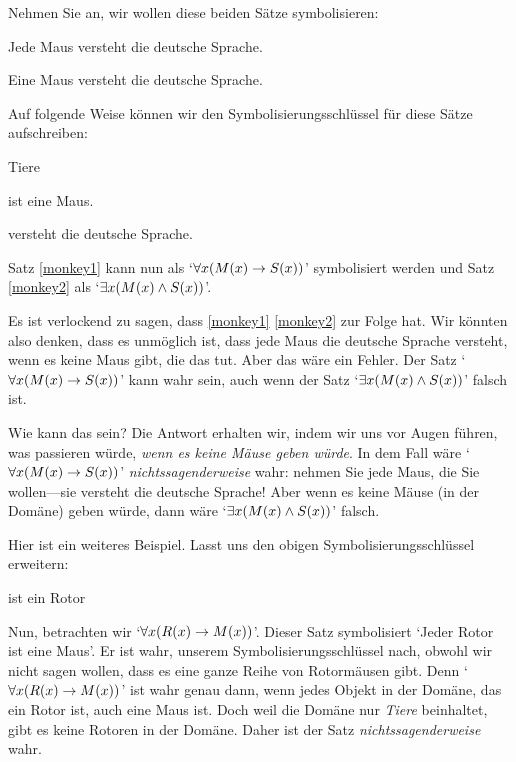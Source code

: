Nehmen Sie an, wir wollen diese beiden Sätze symbolisieren:
	\begin{earg}
		\item[\ex{monkey1}] Jede Maus versteht die deutsche Sprache.
		\item[\ex{monkey2}] Eine Maus versteht die deutsche Sprache.
	\end{earg}
Auf folgende Weise können wir den Symbolisierungsschlüssel für diese Sätze aufschreiben:
	\begin{ekey}
		\item[\text{Domäne}] Tiere
		\item[\atom{M}{x}]  ist eine Maus.
		\item[\atom{S}{x}]  versteht die deutsche Sprache.
	\end{ekey}
Satz \ref{monkey1} kann nun als `$\forall x(\mathord{M}(x) \rightarrow \mathord{S}(x))$' symbolisiert werden und Satz \ref{monkey2} als `$\exists x(\mathord{M}(x) \wedge \mathord{S}(x))$'.

Es ist verlockend zu sagen, dass \ref{monkey1} \ref{monkey2} zur Folge hat. Wir könnten also denken, dass es unmöglich ist, dass jede Maus die deutsche Sprache versteht, wenn es keine Maus gibt, die das tut. Aber das wäre ein Fehler. Der Satz `$\forall x(\mathord{M}(x) \rightarrow \mathord{S}(x))$'  kann wahr sein, auch wenn der Satz `$\exists x(\mathord{M}(x) \wedge \mathord{S}(x))$' falsch ist.

Wie kann das sein? Die Antwort erhalten wir, indem wir uns vor Augen führen, was passieren würde, \emph{wenn es keine Mäuse geben würde}. In dem Fall wäre `$\forall x(\mathord{M}(x) \rightarrow \mathord{S}(x))$' \emph{nichtssagenderweise} wahr: nehmen Sie jede Maus, die Sie wollen---sie versteht die deutsche Sprache! Aber wenn es keine Mäuse (in der Domäne) geben würde, dann wäre `$\exists x(\mathord{M}(x) \wedge \mathord{S}(x))$' falsch.

Hier ist ein weiteres Beispiel. Lasst uns den obigen Symbolisierungsschlüssel erweitern:
	\begin{ekey}
		\item[\atom{R}{x}]  ist ein Rotor
	\end{ekey}
Nun, betrachten wir `$\forall x(\mathord{R}(x) \rightarrow \mathord{M}(x))$'. Dieser Satz symbolisiert `Jeder Rotor ist eine Maus'. Er ist wahr, unserem Symbolisierungsschlüssel nach, obwohl wir nicht sagen wollen, dass es eine ganze Reihe von Rotormäusen gibt. Denn `$\forall x(\mathord{R}(x) \rightarrow \mathord{M}(x))$' ist wahr genau dann, wenn jedes Objekt in der Domäne, das ein Rotor ist, auch eine Maus ist. Doch weil die Domäne nur \emph{Tiere} beinhaltet, gibt es keine Rotoren in der Domäne. Daher ist der Satz \emph{nichtssagenderweise} wahr. 

